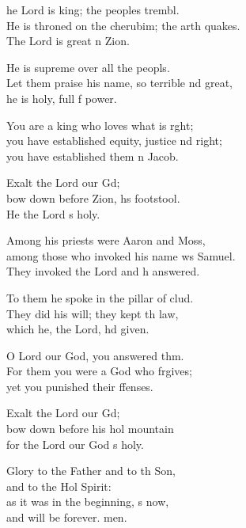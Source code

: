 \settowidth{\versewidth}{He is throned on the cherubim; the earth quakes. *}
\begin{psalmverse}%
  \begin{patverse}
he Lord is king; the peoples trembl.\Flex\\
He is throned on the cherubim; the arth quakes.\Med\\
The Lord is great \pointup{\i}n Zion.

He is supreme over all the peopls.\Flex\\
Let them praise his name, so terrible nd great,\Med\\
he is holy, full f power.

You are a king who loves what is r\pointup{\i}ght;\Flex\\
you have established equity, justice nd right;\Med\\
you have established them \pointup{\i}n Jacob.

Exalt the Lord our Gd;\Flex\\
bow down before Zion, h\pointup{\i}s footstool.\Med\\
He the Lord \pointup{\i}s holy.

Among his priests were Aaron and Moss,\Flex\\
among those who invoked his name ws Samuel.\Med\\
They invoked the Lord and h answered.

To them he spoke in the pillar of clud.\Flex\\
They did his will; they kept th law,\Med\\
which he, the Lord, hd given.

O Lord our God, you answered thm.\Flex\\
For them you were a God who frgives;\Med\\
yet you punished their ffenses.

Exalt the Lord our Gd;\Flex\\
bow down before his hol mountain\Med\\
for the Lord our God \pointup{\i}s holy.

Glory to the Father and to th Son,\Med\\
and to the Hol Spirit:\\
as it was in the beginning, \pointup{\i}s now,\Med\\
and will be forever. men.
  \end{patverse}
\end{psalmverse}
